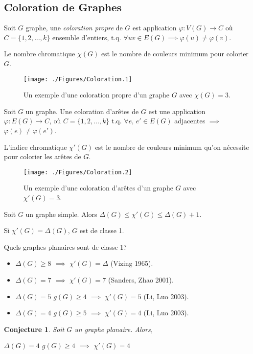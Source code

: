 \documentclass{beamer}
\newtheorem{conjecture}{Conjecture}
\begin{document}
\subsection{Coloration de Graphes}
\begin{frame}
Soit $G$ graphe, une \emph{coloration propre} de $G$ est application $\varphi: V(G) \to C$ où $C=\{1,2,...,k\}$ ensemble d'entiers, t.q. $\forall uv\in E(G) \implies\varphi(u) \neq \varphi(v)$. 

Le nombre chromatique $\chi(G)$ est le nombre de couleurs minimum pour colorier $G$.

\begin{figure}[ht]
\centerline{
\texttt{[image: ./Figures/Coloration.1]}
}
\caption{Un exemple d'une coloration propre d'un graphe $G$ avec $\chi(G)=3$.}
\end{figure}

\end{frame}
\begin{frame}
Soit $G$ un graphe. Une coloration d'arêtes de $G$ est une application $\varphi:E(G) \to C$, où $C=\{1,2,...,k\}$ t.q. $\forall e$, $e' \in E(G)$ adjacentes $\implies$ $\varphi(e) \neq \varphi(e')$. 

L'indice chromatique $\chi'(G)$ est le nombre de couleurs minimum qu'on nécessite pour colorier les arêtes de $G$.

\begin{figure}[ht]
\centerline{
\texttt{[image: ./Figures/Coloration.2]}
}
\caption{Un exemple d'une coloration d'arêtes d'un graphe $G$ avec $\chi'(G)=3$.}
\end{figure}
\end{frame}

\begin{frame}
\begin{theorem}[Vizing]
Soit $G$ un graphe simple. Alors $\Delta(G) \leq \chi'(G) \leq \Delta(G) + 1$.
\end{theorem}
Si $\chi'(G) = \Delta(G)$,  $G$ est de classe 1.

\pause
Quels graphes planaires sont de classe 1?
\begin{itemize}
\item $\Delta(G) \geq 8$ $\implies$ $\chi'(G)=\Delta$ (Vizing 1965).
\item $\Delta(G) = 7$ $\implies$ $\chi'(G)=7$ (Sanders, Zhao 2001).
\item $\Delta(G) = 5$ $g(G) \geq 4$ $\implies$ $\chi'(G) = 5$ (Li, Luo 2003).
\item $\Delta(G) = 4$ $g(G) \geq 5$ $\implies$ $\chi'(G) = 4$ (Li, Luo 2003).
\end{itemize}
\begin{conjecture}
Soit $G$ un graphe planaire. Alors,

$\Delta(G) = 4$ $g(G) \geq 4$ $\implies$ $\chi'(G) = 4$
\end{conjecture}
\end{frame}
\end{document}
